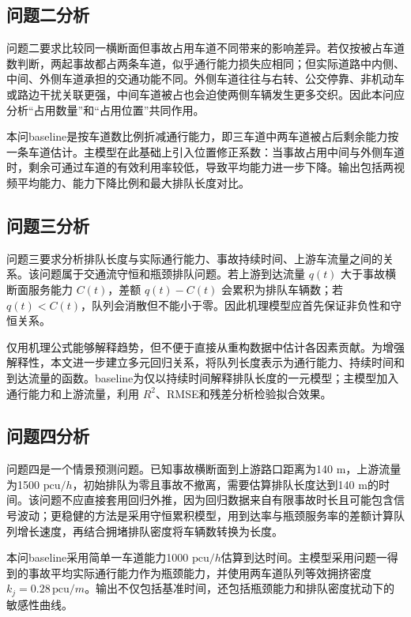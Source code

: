 \documentclass[UTF8,a4paper,12pt]{ctexart}
\newcommand{\pcu}{\mathrm{pcu}}
\begin{document}
\subsection{问题二分析}
问题二要求比较同一横断面但事故占用车道不同带来的影响差异。若仅按被占车道数判断，两起事故都占两条车道，似乎通行能力损失应相同；但实际道路中内侧、中间、外侧车道承担的交通功能不同。外侧车道往往与右转、公交停靠、非机动车或路边干扰关联更强，中间车道被占也会迫使两侧车辆发生更多交织。因此本问应分析“占用数量”和“占用位置”共同作用。

本问baseline是按车道数比例折减通行能力，即三车道中两车道被占后剩余能力按一条车道估计。主模型在此基础上引入位置修正系数：当事故占用中间与外侧车道时，剩余可通过车道的有效利用率较低，导致平均能力进一步下降。输出包括两视频平均能力、能力下降比例和最大排队长度对比。

\subsection{问题三分析}
问题三要求分析排队长度与实际通行能力、事故持续时间、上游车流量之间的关系。该问题属于交通流守恒和瓶颈排队问题。若上游到达流量 $q(t)$ 大于事故横断面服务能力 $C(t)$，差额 $q(t)-C(t)$ 会累积为排队车辆数；若 $q(t)<C(t)$，队列会消散但不能小于零。因此机理模型应首先保证非负性和守恒关系。

仅用机理公式能够解释趋势，但不便于直接从重构数据中估计各因素贡献。为增强解释性，本文进一步建立多元回归关系，将队列长度表示为通行能力、持续时间和到达流量的函数。baseline为仅以持续时间解释排队长度的一元模型；主模型加入通行能力和上游流量，利用 $R^2$、RMSE和残差分析检验拟合效果。

\subsection{问题四分析}
问题四是一个情景预测问题。已知事故横断面到上游路口距离为140 m，上游流量为1500 $\pcu/h$，初始排队为零且事故不撤离，需要估算排队长度达到140 m的时间。该问题不应直接套用回归外推，因为回归数据来自有限事故时长且可能包含信号波动；更稳健的方法是采用守恒累积模型，用到达率与瓶颈服务率的差额计算队列增长速度，再结合拥堵排队密度将车辆数转换为长度。

本问baseline采用简单一车道能力1000 $\pcu/h$估算到达时间。主模型采用问题一得到的事故平均实际通行能力作为瓶颈能力，并使用两车道队列等效拥挤密度 $k_j=0.28\,\pcu/m$。输出不仅包括基准时间，还包括瓶颈能力和排队密度扰动下的敏感性曲线。
\end{document}
